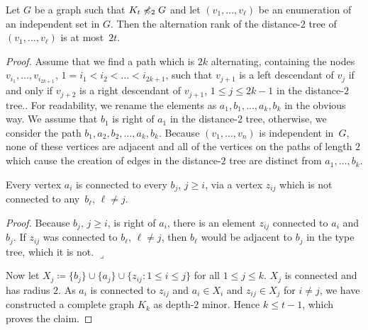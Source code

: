 \begin{lemma}\label{thm:alternation-rank-type-tree}
Let $G$ be a graph such that $K_t\not\preccurlyeq_2G$ and let
$(v_1,\ldots, v_\ell)$ be an enumeration of an independent set 
in $G$. Then the alternation rank of the distance-$2$ tree of 
$(v_1,\ldots, v_\ell)$ is at most~$2t$. 
\end{lemma}
\begin{proof}
Assume that we find a path which is $2k$ alternating, 
containing the nodes $v_{i_1},\ldots, v_{i_{2k+1}}$, $1=i_1<i_2<\ldots <i_{2k+1}$, such that $v_{j+1}$ is a left descendant of $v_j$
if and only if $v_{j+2}$ is a right descendant of $v_{j+1}$, $1\leq j\leq 2k-1$ in
the distance-$2$ tree.. 
For readability, we rename the elements as $a_1,b_1,\ldots, a_k,b_k$ in the 
obvious way. We assume that $b_1$ is right of $a_1$ in the distance-$2$ 
tree, otherwise, we consider
the path $b_1,a_2,b_2,\ldots,a_k, b_k$. Because $(v_1,\ldots, v_n)$ is 
independent in~$G$, 
none of these vertices are adjacent and all of the vertices on the
paths of length $2$ which cause the creation of edges in the distance-$2$
tree are distinct from $a_1,\ldots, b_k$. 

\begin{claim}
Every vertex $a_i$ is connected to every $b_j$, $j\geq i$,
via a vertex $z_{ij}$ which is not connected to any~$b_\ell$, $\ell\neq j$. 
\end{claim}

\noindent\textit{Proof.} Because $b_j$, $j\geq i$, is right of $a_i$, there is 
an element $z_{ij}$ connected to $a_i$ and $b_j$. If $z_{ij}$ was 
connected to $b_\ell$, $\ell\neq j$, then $b_\ell$ would be adjacent 
to $b_j$ in the type tree, which it is not. \hfill$\lrcorner$

\bigskip
Now let $X_j\coloneqq \{b_j\}\cup\{a_j\}\cup\{z_{ij} : 1\leq i\leq j\}$
for all $1\leq j\leq k$. $X_j$ is connected and has radius $2$. As $a_i$
is connected to $z_{ij}$ and $a_i\in X_i$ and $z_{ij}\in X_j$ for $i\neq j$, 
we have constructed a complete graph $K_k$ as depth-$2$ minor. Hence 
$k\leq t-1$, which proves the claim. 
\end{proof}

%


